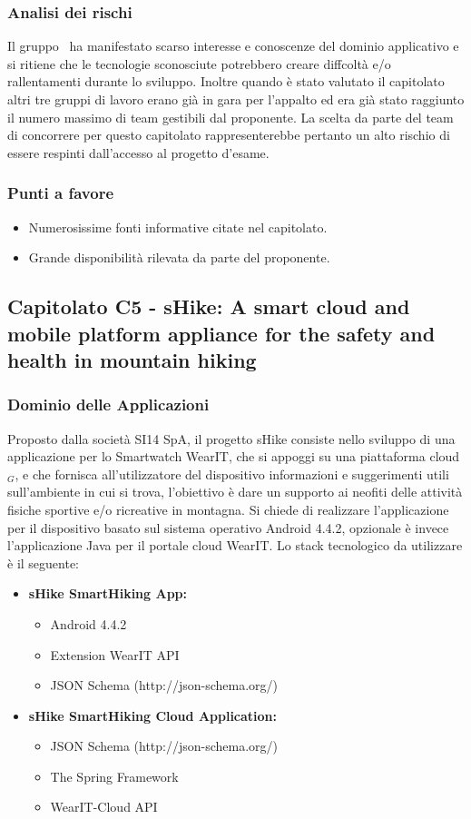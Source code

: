   \subsubsection{Analisi dei rischi}
  Il gruppo \gruppo\ ha manifestato scarso interesse e conoscenze del dominio applicativo e si ritiene che le tecnologie sconosciute 
  potrebbero creare diffcoltà e/o rallentamenti durante lo sviluppo.
  Inoltre quando è stato valutato il capitolato altri tre gruppi di lavoro erano già in gara per l'appalto ed era già stato raggiunto il numero massimo di team gestibili dal proponente. La scelta da parte del team di concorrere per questo capitolato rappresenterebbe pertanto un alto rischio di essere respinti dall'accesso al progetto d'esame.
  \subsubsection{Punti a favore}
  \begin{itemize}
  	\item Numerosissime fonti informative citate nel capitolato.
  	\item Grande disponibilità rilevata da parte del proponente.
  \end{itemize}
\newpage
\subsection{Capitolato C5 - sHike: A smart cloud and mobile platform appliance for the safety and health in mountain hiking}
  \subsubsection{Dominio delle Applicazioni}
  Proposto dalla società SI14 SpA, il progetto sHike consiste nello sviluppo di una applicazione per lo Smartwatch WearIT, che si appoggi su una piattaforma cloud$_{G}$, e che fornisca all'utilizzatore del dispositivo informazioni e suggerimenti utili sull'ambiente in cui si trova, l'obiettivo è dare un supporto ai neofiti delle attività fisiche sportive e/o ricreative in montagna. Si chiede di realizzare l'applicazione per il dispositivo basato sul sistema operativo Android 4.4.2, opzionale è invece l'applicazione Java per il portale cloud WearIT. Lo stack tecnologico da utilizzare è il seguente:
  \begin{itemize}
  \item \textbf{sHike SmartHiking App:}
     \begin{itemize}
	     \item Android 4.4.2
	     \item Extension WearIT API
		 \item JSON Schema (http://json-schema.org/)
     \end{itemize}
  \item \textbf{sHike SmartHiking Cloud Application:}
     \begin{itemize}
       	\item JSON Schema (http://json-schema.org/)
       	\item The Spring Framework
	    \item WearIT-Cloud API
     \end{itemize}
  \end{itemize}
